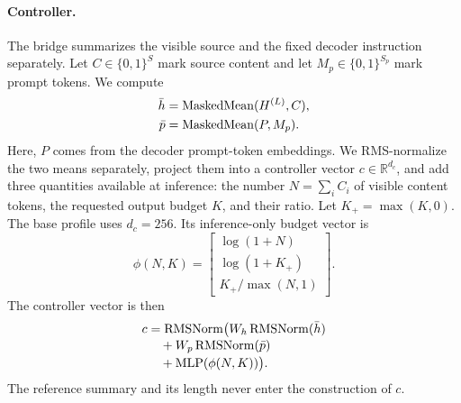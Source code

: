 \paragraph{Controller.}
The bridge summarizes the visible source and the fixed decoder instruction
separately.  Let $C\in\{0,1\}^S$ mark source content and let
$M_p\in\{0,1\}^{S_p}$ mark prompt tokens.  We compute
\begin{equation}
  \begin{aligned}
    \bar h&=\operatorname{MaskedMean}(H^{(L)},C),\\
    \bar p&=\operatorname{MaskedMean}(P,M_p).
  \end{aligned}
\end{equation}
Here, $P$ comes from the decoder prompt-token embeddings.  We RMS-normalize the
two means separately, project them into a controller vector
$c\in\mathbb{R}^{d_c}$, and add three quantities available at inference: the
number $N=\sum_i C_i$ of visible content tokens, the requested output budget
$K$, and their ratio.  Let $K_+=\max(K,0)$.  The base profile uses
$d_c=256$.  Its inference-only budget vector is
\begin{equation*}
  \phi(N,K)=\left[\begin{array}{c}
    \log(1+N)\\[-1pt]
    \log(1+K_+)\\[-1pt]
    K_+/\max(N,1)
  \end{array}\right].
\end{equation*}
The controller vector is then
\begin{equation}
  \begin{aligned}
    c&=\operatorname{RMSNorm}\!\big(W_h\operatorname{RMSNorm}(\bar h)\\[-2pt]
      &\quad +W_p\operatorname{RMSNorm}(\bar p)\\[-2pt]
      &\quad +\operatorname{MLP}(\phi(N,K))\big).
  \end{aligned}
  \label{eq:controller}
\end{equation}
The reference summary and its length never enter the construction of $c$.

